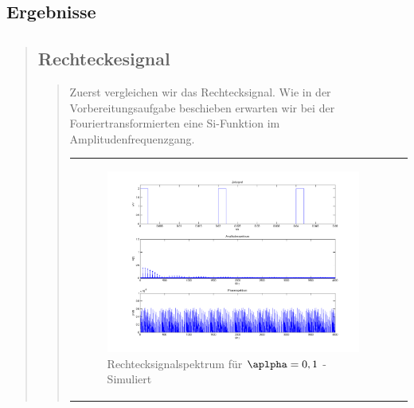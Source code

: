         
        
	
\subsection{Ergebnisse}
\begin{quote}
    \subsection{Rechteckesignal}
    \begin{quote}
        Zuerst vergleichen wir das Rechtecksignal. Wie in der Vorbereitungsaufgabe beschieben erwarten wir bei der
        Fouriertransformierten eine Si-Funktion im Amplitudenfrequenzgang.

            \begin{center}
            \begin{tabular}{ll}
            
            \hspace{-12em}
                \begin{minipage}{0.6\textwidth}
                    
                    \begin{figure}[H]
                        \label{fig:}            
                        \includegraphics[scale=0.25]{./Bilder/recht_alpha1.png} %
                        \caption{Rechtecksignalspektrum für $\aplpha = 0,1$ - Simuliert}
                    \end{figure}
                    

\end{minipage}
\end{tabular}
\end{center}
\end{quote}
\end{quote}
